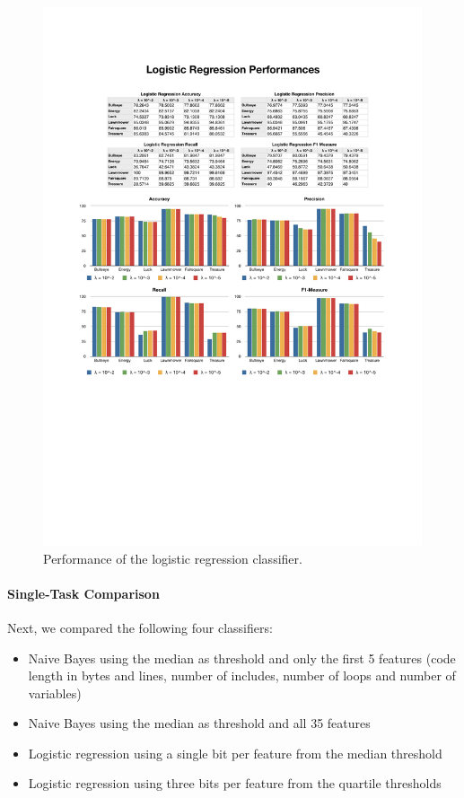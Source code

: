%
\begin{figure}
    \centering
    \setlength{\tabcolsep}{0.0130\linewidth}
    \includegraphics[width=\linewidth]{figures/LogisticRegression}
    \caption{Performance of the logistic regression classifier.%
      \label{fig:logisticregression}}
\end{figure}

\paragraph*{Single-Task Comparison}
Next, we compared the following four classifiers:

\begin{itemize}
\item Naive Bayes using the median as threshold and only the first 5 features (code length in bytes and lines, number of includes, number of loops and number of variables)
\item Naive Bayes using the median as threshold and all 35 features
\item Logistic regression using a single bit per feature from the median threshold
\item Logistic regression using three bits per feature from the quartile thresholds
\end{itemize}

